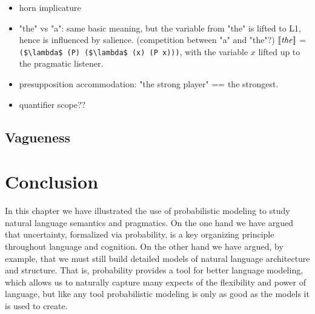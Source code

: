 \documentclass[pdfextras]{handbook}
\newcommand{\llbracket}{\ensuremath{\left [\!\left [}}%
\newcommand{\rrbracket}{\ensuremath{\right ]\!\right ]}}
\providecommand{\sv}[1]{\ensuremath{\llbracket \mathit{#1} \rrbracket}}
\begin{document}


\begin{itemize}
\item horn implicature
\item  "the" vs "a": same basic meaning, but the variable from "the" is lifted to L1, hence is influenced by salience. (competition between "a" and "the"?)
\subitem \sv{the} = \lstinline[mathescape]{($\lambda$ (P) ($\lambda$ (x) (P x)))}, with the variable $x$ lifted up to the pragmatic listener. 
\item  presupposition accommodation: "the strong player" == the strongest.
\item quantifier scope??
\end{itemize}

\subsection{Vagueness}









\section{Conclusion}

In this chapter we have illustrated the use of probabilistic modeling to study natural language semantics and pragmatics. On the one hand we have argued that uncertainty, formalized via probability, is a key organizing principle throughout language and cognition. On the other hand we have argued, by example, that we must still build detailed models of natural language architecture and structure. That is, probability provides a tool for better language modeling, which allows us to naturally capture many expects of the flexibility and power of language, but like any tool probabilistic modeling is only as good as the models it is used to create.
\end{document}
